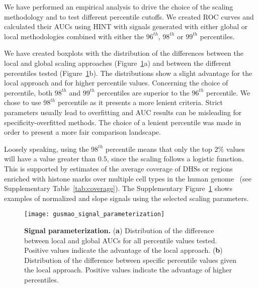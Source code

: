 We have performed an empirical analysis to drive the choice of the scaling methodology and to test different percentile cutoffs. We created ROC curves and calculated their AUCs using HINT with signals generated with either global or local methodologies combined with either the $96^{th}$, $98^{th}$ or $99^{th}$ percentiles.

We have created boxplots with the distribution of the differences between the local and global scaling approaches (Figure~\ref{fig:gusmao_signal_parameterization}a) and between the different percentiles tested (Figure~\ref{fig:gusmao_signal_parameterization}b). The distributions show a slight advantage for the local approach and for higher percentile values. Concerning the choice of percentile, both $98^{th}$ and $99^{th}$ percentiles are superior to the $96^{th}$ percentile. We chose to use $98^{th}$ percentile as it presents a more lenient criteria. Strict parameters usually lead to overfitting and AUC results can be misleading for specificity-overfitted methods. The choice of a lenient percentile was made in order to present a more fair comparison landscape.

Loosely speaking, using the $98^{th}$ percentile means that only the top $2\%$ values will have a value greater than $0.5$, since the scaling follows a logistic function. This is supported by estimates of the average coverage of DHSs or regions enriched with histone marks over multiple cell types in the human genome~\cite{encode2012} (see Supplementary Table~\ref{tab:coverage}). The Supplementary Figure~\ref{fig:gusmao_signal_parameterization} shows examples of normalized and slope signals using the selected scaling parameters.

\begin{figure}[h!]
\centering
\texttt{[image: gusmao\_signal\_parameterization]}
\caption[Signal parameterization]{\textbf{Signal parameterization.} (\textbf{a}) Distribution of the difference between local and global AUCs for all percentile values tested. Positive values indicate the advantage of the local approach. (\textbf{b}) Distribution of the difference between specific percentile values given the local approach. Positive values indicate the advantage of higher percentiles.}
\label{fig:gusmao_signal_parameterization}
\end{figure}

